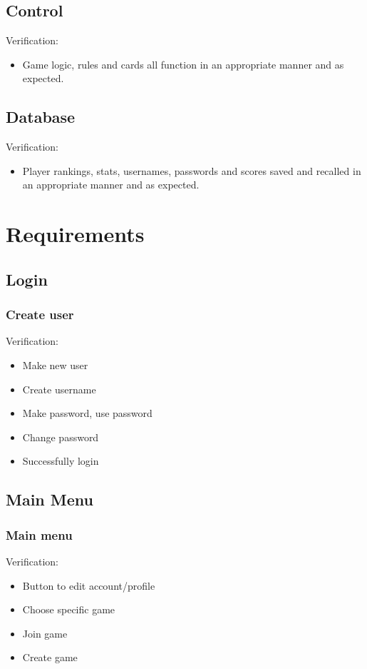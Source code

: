 \documentclass[11pt, titlepage]{article}
\begin{document}
			
		\subsection{Control}
			Verification:
			\begin{itemize}
				\item Game logic, rules and cards all function in an appropriate manner and as expected.
			\end{itemize}
			
		\subsection{Database}
		Verification:
		\begin{itemize}
			\item Player rankings, stats, usernames, passwords and scores saved and recalled in an appropriate manner and as expected.
		\end{itemize}
			
	\section{Requirements}
	
		\subsection{Login}
			\subsubsection{Create user}
			Verification:
			\begin{itemize} 
				\item Make new user
				\item Create username
				\item Make password, use password
				\item Change password
				\item Successfully login 
			\end{itemize}

		\subsection{Main Menu}
			\subsubsection{Main menu}
			Verification:
				\begin{itemize}
					\item Button to edit account/profile
					\item Choose specific game
					\item Join game
					\item Create game
				\end{itemize}
			
\end{document}
